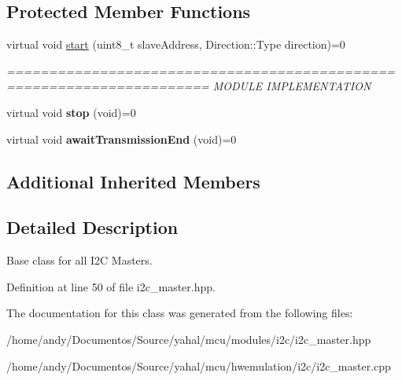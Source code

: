 \subsection*{Protected Member Functions}
\begin{DoxyCompactItemize}
\item 
\hypertarget{classyahal_1_1mcu_1_1_i2_c__master_a515d0a5f65c651a5a50f0b1188e5c76c}{}virtual void \hyperlink{classyahal_1_1mcu_1_1_i2_c__master_a515d0a5f65c651a5a50f0b1188e5c76c}{start} (uint8\+\_\+t slave\+Address, Direction\+::\+Type direction)=0\label{classyahal_1_1mcu_1_1_i2_c__master_a515d0a5f65c651a5a50f0b1188e5c76c}

\begin{DoxyCompactList}\small\item\em ====================================================================== M\+O\+D\+U\+L\+E I\+M\+P\+L\+E\+M\+E\+N\+T\+A\+T\+I\+O\+N \end{DoxyCompactList}\item 
\hypertarget{classyahal_1_1mcu_1_1_i2_c__master_a6e6917ff19fb323e899970dd511a533b}{}virtual void {\bfseries stop} (void)=0\label{classyahal_1_1mcu_1_1_i2_c__master_a6e6917ff19fb323e899970dd511a533b}

\item 
\hypertarget{classyahal_1_1mcu_1_1_i2_c__master_ad8a78ad95cebfbd6e4140456a5e78bec}{}virtual void {\bfseries await\+Transmission\+End} (void)=0\label{classyahal_1_1mcu_1_1_i2_c__master_ad8a78ad95cebfbd6e4140456a5e78bec}

\end{DoxyCompactItemize}
\subsection*{Additional Inherited Members}


\subsection{Detailed Description}
Base class for all I2\+C Masters. 

Definition at line 50 of file i2c\+\_\+master.\+hpp.



The documentation for this class was generated from the following files\+:\begin{DoxyCompactItemize}
\item 
/home/andy/\+Documentos/\+Source/yahal/mcu/modules/i2c/i2c\+\_\+master.\+hpp\item 
/home/andy/\+Documentos/\+Source/yahal/mcu/hwemulation/i2c/i2c\+\_\+master.\+cpp\end{DoxyCompactItemize}

